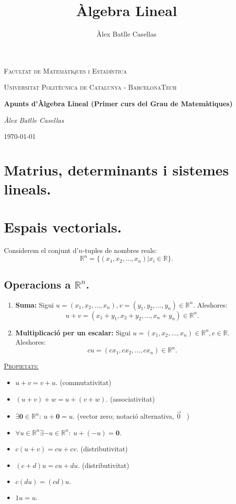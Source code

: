 \documentclass[11pt]{article}
\title{Àlgebra Lineal}
\author{Àlex Batlle Casellas}
\begin{document}
\begin{titlepage}
	\centering
	{\scshape\LARGE Facultat de Matemàtiques i Estadística \par}
	\vspace{1cm}
	{\scshape\Large Universitat Politècnica de Catalunya - BarcelonaTech\par}
	\vspace{1.5cm}
	{\huge\bfseries Apunts d'Àlgebra Lineal (Primer curs del Grau de Matemàtiques)
	\par}
	\vspace{2cm}
	{\Large\itshape Àlex Batlle Casellas\par}

	\vfill

	{\large \today\par}
\end{titlepage}


\vfill
\newpage

\tableofcontents
\newpage
\section{Matrius, determinants i sistemes lineals.}

\newpage
\section{Espais vectorials.}
Considerem el conjunt d'$n$-tuples de nombres reals:
$$\mathbb{R}^n=\{(x_1,x_2,\ldots,x_n)|x_i\in\mathbb{R}\}.$$
\subsection{Operacions a $\mathbb{R}^n$.}
\begin{enumerate}
	\item \textbf{Suma:} Sigui $u=(x_1,x_2,\ldots,x_n),v=(y_1,y_2,\ldots,y_n)\in\mathbb{R}^n$. Aleshores:
	$$u+v=(x_1+y_1,x_2+y_2,\ldots,x_n+y_n)\in\mathbb{R}^n.$$
	\item \textbf{Multiplicació per un escalar:} Sigui $u=(x_1,x_2,\ldots,x_n)\in\mathbb{R}^n,c\in\mathbb{R}$. Aleshores:
	$$cu=(cx_1,cx_2,\ldots,cx_n)\in\mathbb{R}^n.$$
\end{enumerate}
\underline{{\scshape Propietats:}}
\begin{itemize}
	\item $u+v=v+u.$ (commutativitat)
	\item $(u+v)+w=u+(v+w).$ (associativitat)
	\item $\exists\textbf{0}\in\mathbb{R}^n: \ u+\textbf{0}=u.$ (vector zero; notació alternativa, $\vec{0}$ \ )
	\item $\forall u\in\mathbb{R}^n\exists -u\in\mathbb{R}^n: \ u + (-u) = \textbf{0}.$
	\item $c(u+v)=cu+cv.$ (distributivitat)
	\item $(c+d)u=cu+du.$ (distributivitat)
	\item $c(du)=(cd)u.$
	\item $1u=u.$
\end{itemize}
\end{document}
